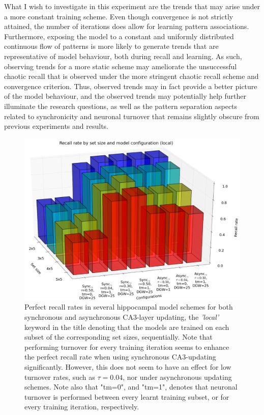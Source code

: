 What I wish to investigate in this experiment are the trends that may arise under a more constant training scheme. Even though convergence is not strictly attained, the number of iterations does allow for learning pattern associations. Furthermore, exposing the model to a constant and uniformly distributed continuous flow of patterns is more likely to generate trends that are representative of model behaviour, both during recall and learning. As such, observing trends for a more static scheme may ameliorate the unsuccessful chaotic recall that is observed under the more stringent chaotic recall scheme and convergence criterion. Thus, observed trends may in fact provide a better picture of the model behaviour, and the observed trends may potentially help further illuminate the research questions, as well as the pattern separation aspects related to synchronicity and neuronal turnover that remains slightly obscure from previous experiments and results.


\begin{figure}
    \centering
    \includegraphics[width=14cm]{fig/i-iters/local-recall}
    \caption{Perfect recall rates in several hippocampal model schemes for both synchronous and asynchronous CA3-layer updating, the \textit{'local'} keyword in the title denoting that the models are trained on each subset of the corresponding set sizes, sequentially. Note that performing turnover for every training iteration seems to enhance the perfect recall rate when using synchronous CA3-updating significantly. However, this does not seem to have an effect for low turnover rates, such as $\tau=0.04$, nor under asynchronous updating schemes. Note also that "tm=0", and "tm=1", denotes that neuronal turnover is performed between every learnt training subset, or for every training iteration, respectively.}
    \label{fig:local-recall}
\end{figure}


